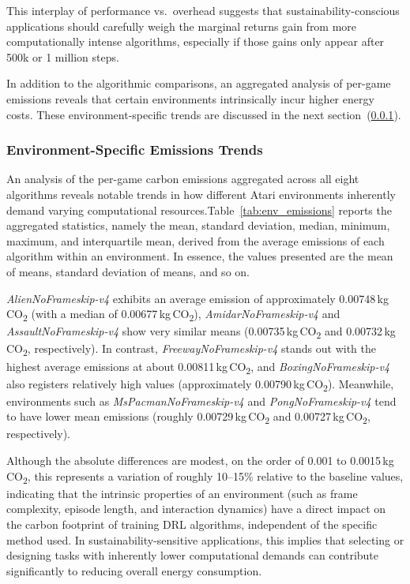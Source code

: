 This interplay of performance vs.\ overhead suggests that sustainability-conscious 
applications should carefully weigh the marginal returns gain from more computationally 
intense algorithms, especially if those gains only appear after 500k or 1 million steps.

In addition to the algorithmic comparisons, an aggregated analysis of per-game emissions reveals that certain environments intrinsically incur higher energy costs. These environment-specific trends are discussed in the next section~(\ref{subsubsec:environment_emissions}).

\subsubsection{Environment-Specific Emissions Trends}
\label{subsubsec:environment_emissions}
An analysis of the per-game carbon emissions aggregated across all eight algorithms reveals notable trends in how different Atari environments inherently demand varying computational resources.Table~\ref{tab:env_emissions} reports the aggregated statistics, namely the mean, standard deviation, median, minimum, maximum, and interquartile mean, derived from the average emissions of each algorithm within an environment. In essence, the values presented are the mean of means, standard deviation of means, and so on.

\emph{AlienNoFrameskip-v4} exhibits an average emission of approximately \num{0.00748}\,kg\,CO\textsubscript{2} (with a median of \num{0.00677}\,kg\,CO\textsubscript{2}), \emph{AmidarNoFrameskip-v4} and \emph{AssaultNoFrameskip-v4} show very similar means (\num{0.00735}\,kg\,CO\textsubscript{2} and \num{0.00732}\,kg\,CO\textsubscript{2}, respectively). In contrast, \emph{FreewayNoFrameskip-v4} stands out with the highest average emissions at about \num{0.00811}\,kg\,CO\textsubscript{2}, and \emph{BoxingNoFrameskip-v4} also registers relatively high values (approximately \num{0.00790}\,kg\,CO\textsubscript{2}). Meanwhile, environments such as \emph{MsPacmanNoFrameskip-v4} and \emph{PongNoFrameskip-v4} tend to have lower mean emissions (roughly \num{0.00729}\,kg\,CO\textsubscript{2} and \num{0.00727}\,kg\,CO\textsubscript{2}, respectively).

Although the absolute differences are modest, on the order of \num{0.001} to \num{0.0015}\,kg\,CO\textsubscript{2}, this represents a variation of roughly \num{10}–\num{15}\% relative to the baseline values, indicating that the intrinsic properties of an environment (such as frame complexity, episode length, and interaction dynamics) have a direct impact on the carbon footprint of training DRL algorithms, independent of the specific method used. In sustainability-sensitive applications, this implies that selecting or designing tasks with inherently lower computational demands can contribute significantly to reducing overall energy consumption.


